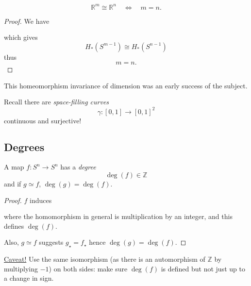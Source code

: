 \documentclass[a4paper,11pt]{article}
\begin{document}
	\begin{cor}
		$$\mathbb{R}^m \cong \mathbb{R}^n \quad \Leftrightarrow \quad m = n.$$
	\end{cor}
	\begin{proof}
		We have
		\begin{center}
		\end{center}
		which gives
		\[
			H_*(S ^{m-1}) \cong H_* (S ^{n-1})
		\]
		thus
		\[
			m = n.
		\]
	\end{proof}

	This homeomorphism invariance of dimension was an early success of the subject.

	Recall there are \emph{space-filling curves}
	\[
		\gamma : [0,1] \to [0,1]^2
	\]
	continuous and surjective!

	\subsection{Degrees} 

	\begin{lem}
		A map $f : S^n \to S^n$ has a \emph{degree}
		\[
			\deg(f) \in \mathbb{Z}
		\]
		and if $g \simeq f$, $\deg(g) = \deg(f)$.
	\end{lem}

	\begin{proof}
		$f$ induces
		\begin{center}
		\end{center}
		where the homomorphism in general is multiplication by an integer, and this defines $\deg(f)$.

		Also, $g \simeq f$ suggests $g_\star = f_\star$ hence $\deg(g) = \deg(f)$.
	\end{proof}

	\begin{nt}
		{\color{red}\underline{Caveat!}} Use the same isomorphism (as there is an automorphism of $\mathbb{Z}$ by multiplying $-1$) on both sides: make sure $\deg(f)$ is defined but not just up to a change in sign.
	\end{nt}
\end{document}

